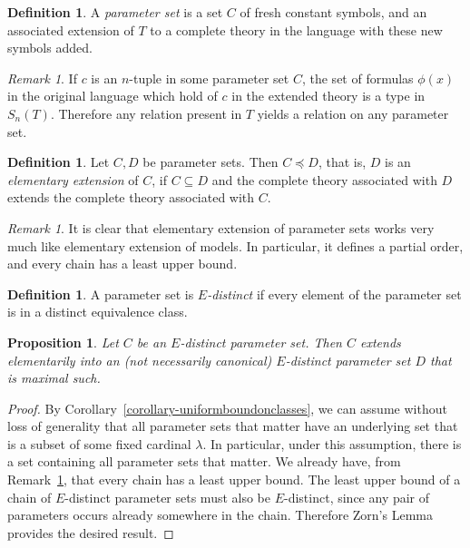 \documentclass[letterpaper,twoside]{article}
\newtheorem{proposition}[theorem]{Proposition}
\theoremstyle{definition}
\newtheorem{definition}[theorem]{Definition}
\theoremstyle{remark}
\newtheorem{remark}[theorem]{Remark}
\newcommand{\defterm}[1]{\emph{#1}}
\renewcommand{\elsubeq}{\preceq}
\begin{document}
\begin{definition}
  A \defterm{parameter set} is a set \(C\) of fresh constant symbols,
  and an associated extension of \(T\) to a complete theory in the
  language with these new symbols added.
\end{definition}

\begin{remark}
  If \(c\) is an \(n\)-tuple in some parameter set \(C\), the set of
  formulas \(\phi(x)\) in the original language which hold of \(c\) in
  the extended theory is a type in \(S_n(T)\).  Therefore any relation
  present in \(T\) yields a relation on any parameter set.
\end{remark}

\begin{definition}
  Let \(C, D\) be parameter sets.  Then \(C \elsubeq D\), that is,
  \(D\) is an \defterm{elementary extension} of \(C\), if \(C
  \subseteq D\) and the complete theory associated with \(D\) extends
  the complete theory associated with \(C\).
\end{definition}

\begin{remark}\label{remark-elsubisordinary}
  It is clear that elementary extension of parameter sets works very
  much like elementary extension of models.  In particular, it defines
  a partial order, and every chain has a least upper bound.
\end{remark}

\begin{definition}
  A parameter set is \defterm{\(E\)-distinct} if every element of the
  parameter set is in a distinct equivalence class.
\end{definition}

\begin{proposition}\label{proposition-maximalsexist}
  Let \(C\) be an \(E\)-distinct parameter set.  Then \(C\) extends
  elementarily into an (not necessarily canonical) \(E\)-distinct
  parameter set \(D\) that is maximal such.
\end{proposition}
\begin{proof}
  By Corollary~\ref{corollary-uniformboundonclasses}, we can assume
  without loss of generality that all parameter sets that matter have
  an underlying set that is a subset of some fixed cardinal
  \(\lambda\).  In particular, under this assumption, there is a set
  containing all parameter sets that matter.  We already have, from
  Remark~\ref{remark-elsubisordinary}, that every chain has a least
  upper bound.  The least upper bound of a chain of \(E\)-distinct
  parameter sets must also be \(E\)-distinct, since any pair of
  parameters occurs already somewhere in the chain.  Therefore Zorn's
  Lemma provides the desired result.
\end{proof}
\end{document}

